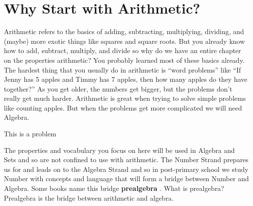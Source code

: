 

\label{chap:properties}



\section{Why Start with Arithmetic?}
Arithmetic refers to the basics of adding, subtracting, multiplying, dividing, and (maybe) more exotic things like squares and square roots.
But you already know how to add, subtract, multiply, and divide  so why do we have an entire chapter on the properties arithmetic?  You probably learned most of these basics already. The hardest thing that you usually do in arithmetic is “word problems” like “If Jenny has 5 apples and Timmy has 7 apples, then how many apples do they have together?” As you get older, the numbers get bigger, but the problems don’t really get much harder. Arithmetic is great when trying to solve simple problems like counting apples. But when the problems get more complicated we will need Algebra.





\operation{}







\begin{problem}
This is a problem
\end{problem}


\begin{connection}
The properties and vocabulary you focus on here will be used in Algebra and Sets and so are not confined to use with arithmetic. The Number Strand prepares us for and leads on to the Algebra Strand and so in post-primary school we study Number with concepts and language that will form a bridge between Number and Algebra. Some books name this bridge \textbf{prealgebra} . What is prealgebra?  Prealgebra is the bridge between arithmetic and algebra.
\end{connection}






 



